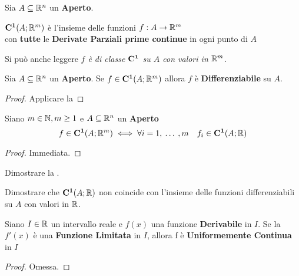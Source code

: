 \begin{definition}
	Sia $A \subseteq \mathbb{R}^n$ un \textbf{Aperto}.
	\begin{center}
		$\mathbf{C^{1}}(A; \mathbb{R}^m)$ è l'insieme delle funzioni $f:A \to \mathbb{R}^m$\\
		con \textbf{tutte} le \textbf{Derivate Parziali prime continue} in ogni punto di $A$
	\end{center}
	Si può anche leggere \textit{$f$ è di classe $\mathbf{C^{1}}$ su $A$ con valori in $\mathbb{R}^m$}.
\end{definition}
\begin{corollary}
	Sia $A \subseteq \mathbb{R}^n$ un \textbf{Aperto}. Se $f \in \mathbf{C^{1}}(A;\mathbb{R}^m)$ allora $f$ è \textbf{Differenziabile} su $A$.
	\begin{proof}
		Applicare la 
	\end{proof}
\end{corollary}
\begin{proposition}
	\label{prop:cnt_class_components}
	Siano $m \in \mathbb{N}, m \geq 1$ e $A \subseteq \mathbb{R}^n$ un \textbf{Aperto}
	\[f \in \mathbf{C^{1}}(A; \mathbb{R}^m) \iff \forall i = 1,\:\dotsc\:, m \quad f_i \in \mathbf{C^{1}}(A;\mathbb{R})\]
	\begin{proof}
		Immediata.
	\end{proof}
\end{proposition}
\begin{exercise}
	Dimostrare la .
\end{exercise}
\begin{exercise}
	Dimostrare che $\mathbf{C^{1}}(A;\mathbb{R})$ non coincide con l'insieme delle funzioni differenziabili su $A$ con valori in $\mathbb{R}$.
\end{exercise}
\begin{proposition}
	\label{prop:if_df_lim_then_unif_cont}
	Siano $I \in \mathbb{R}$ un intervallo reale e $f(x)$ una funzione \textbf{Derivabile} in $I$. Se la $f'(x)$ è una \textbf{Funzione Limitata} in $I$, allora f è \textbf{Uniformemente Continua} in $I$ %
	\begin{proof}
		Omessa. %
	\end{proof}
\end{proposition}

